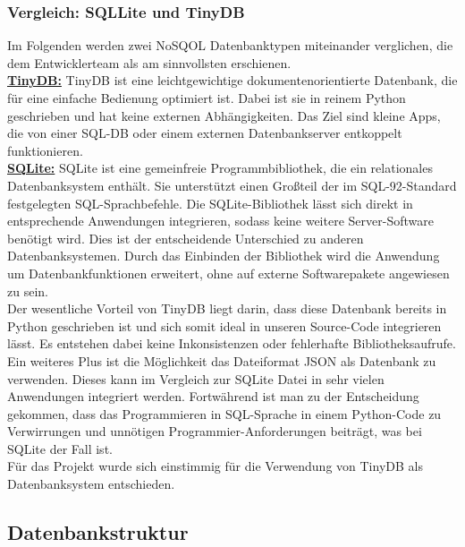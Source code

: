 \documentclass[a4paper,oneside,12pt]{report}
\begin{document}
				
				\subsubsection{Vergleich: SQLLite und TinyDB}
				
					Im Folgenden werden zwei NoSQOL Datenbanktypen miteinander verglichen, die dem Entwicklerteam als am sinnvollsten erschienen.
					\\
					\newline
					\underline{\textbf{TinyDB:}}
					\newline TinyDB ist eine leichtgewichtige dokumentenorientierte Datenbank, die für eine einfache Bedienung optimiert ist. Dabei ist sie in reinem Python geschrieben und hat keine externen Abhängigkeiten. Das Ziel sind kleine Apps, die von einer SQL-DB oder einem externen Datenbankserver entkoppelt funktionieren. \cite{bib-tinydb}
					\\
					\newline					
					\underline{\textbf{SQLite:}}
					\newline SQLite ist eine gemeinfreie Programmbibliothek, die ein relationales Datenbanksystem enthält. Sie unterstützt einen Großteil der im SQL-92-Standard festgelegten SQL-Sprachbefehle. Die SQLite-Bibliothek lässt sich direkt in entsprechende Anwendungen integrieren, sodass keine weitere Server-Software benötigt wird. Dies ist der entscheidende Unterschied zu anderen Datenbanksystemen. Durch das Einbinden der Bibliothek wird die Anwendung um Datenbankfunktionen erweitert, ohne auf externe Softwarepakete angewiesen zu sein. \cite{bib-sqlite}
					\\
					\newline Der wesentliche Vorteil von TinyDB liegt darin, dass diese Datenbank bereits in Python geschrieben ist und sich somit ideal in unseren Source-Code integrieren lässt. Es entstehen dabei keine Inkonsistenzen oder fehlerhafte Bibliotheksaufrufe. Ein weiteres Plus ist die Möglichkeit das Dateiformat JSON als Datenbank zu verwenden. Dieses kann im Vergleich zur SQLite Datei in sehr vielen Anwendungen integriert werden. Fortwährend ist man zu der Entscheidung gekommen, dass das Programmieren in SQL-Sprache in einem Python-Code zu Verwirrungen und unnötigen Programmier-Anforderungen beiträgt, was bei SQLite der Fall ist.
					\\
					Für das Projekt wurde sich einstimmig für die Verwendung von TinyDB als Datenbanksystem entschieden.
					
							
			\subsection{Datenbankstruktur}
			
\end{document}
